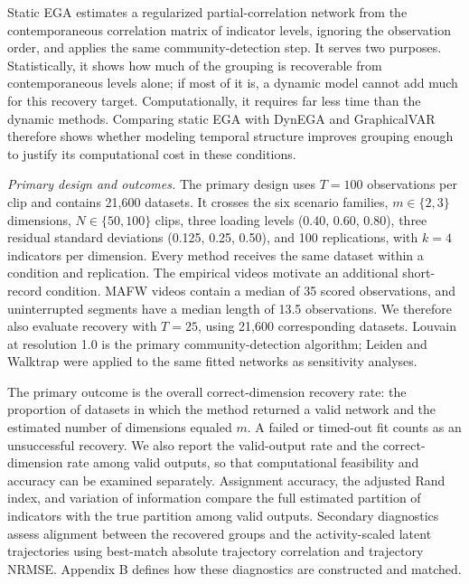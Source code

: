 \documentclass[
]{article}
\begin{document}
Static EGA estimates a regularized partial-correlation network from the
contemporaneous correlation matrix of indicator levels, ignoring the
observation order, and applies the same community-detection step. It
serves two purposes. Statistically, it shows how much of the grouping is
recoverable from contemporaneous levels alone; if most of it is, a
dynamic model cannot add much for this recovery target. Computationally,
it requires far less time than the dynamic methods. Comparing static EGA
with DynEGA and GraphicalVAR therefore shows whether modeling temporal
structure improves grouping enough to justify its computational cost in
these conditions.

\emph{Primary design and outcomes.} The primary design uses \(T=100\)
observations per clip and contains 21,600 datasets. It crosses the six
scenario families, \(m\in\{2,3\}\) dimensions, \(N\in\{50,100\}\) clips,
three loading levels (0.40, 0.60, 0.80), three residual standard
deviations (0.125, 0.25, 0.50), and 100 replications, with \(k=4\)
indicators per dimension. Every method receives the same dataset within
a condition and replication. The empirical videos motivate an additional
short-record condition. MAFW videos contain a median of 35 scored
observations, and uninterrupted segments have a median length of 13.5
observations. We therefore also evaluate recovery with \(T=25\), using
21,600 corresponding datasets. Louvain at resolution 1.0 is the primary
community-detection algorithm; Leiden and Walktrap were applied to the
same fitted networks as sensitivity analyses.

The primary outcome is the overall correct-dimension recovery rate: the
proportion of datasets in which the method returned a valid network and
the estimated number of dimensions equaled \(m\). A failed or timed-out
fit counts as an unsuccessful recovery. We also report the valid-output
rate and the correct-dimension rate among valid outputs, so that
computational feasibility and accuracy can be examined separately.
Assignment accuracy, the adjusted Rand index, and variation of
information compare the full estimated partition of indicators with the
true partition among valid outputs. Secondary diagnostics assess
alignment between the recovered groups and the activity-scaled latent
trajectories using best-match absolute trajectory correlation and
trajectory NRMSE. Appendix B defines how these diagnostics are
constructed and matched.
\end{document}
